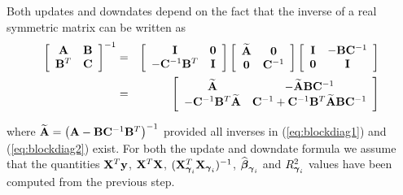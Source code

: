 Both updates and downdates depend on the fact that
the inverse of a real symmetric matrix can be written as
\begin{eqnarray}
	\displaystyle \left[ \begin{array}{cc}
		{\bf A}   & {\bf B} \\
		{\bf B}^T & {\bf C}
	\end{array} \right]^{-1}
	&  = &
	\displaystyle \left[ \begin{array}{cc}
		{\bf I} & {\bf 0} \\
		-{\bf C}^{-1}{\bf B}^T &  {\bf I}
	\end{array} \right]
	\left[ \begin{array}{cc}
		\widetilde{{\bf A}} & {\bf 0} \\
		{\bf 0} & {\bf C}^{-1}
	\end{array} \right]
	\left[ \begin{array}{cc}
		{\bf I}    & -{\bf B}{\bf C}^{-1}\\
		{\bf 0} & {\bf I}
	\end{array} \right] \label{eq:blockdiag1}\\
	&  = &
	\displaystyle\left[
	\begin{array}{cc}
		\widetilde{{\bf A}}
		& - \widetilde{{\bf A}}{\bf B}{\bf C}^{-1} \\
		-{\bf C}^{-1}{\bf B}^T\widetilde{{\bf A}}
		& {\bf C}^{-1} + {\bf C}^{-1}{\bf B}^T\widetilde{{\bf A}}{\bf B}{\bf C}^{-1}
	\end{array}\right]\label{eq:blockdiag2}
\end{eqnarray}

\noindent where $\widetilde{{\bf A}} = \left({\bf A}-{\bf B}{\bf C}^{-1}{\bf B}^T\right)^{-1}$
provided all inverses in (\ref{eq:blockdiag1}) and
(\ref{eq:blockdiag2}) exist. 
For both the update and downdate formula we assume that the quantities
${\bf X}^T{\bf y}$, ${\bf X}^T{\bf X}$, $({\bf X}_{{\boldsymbol \gamma}_i}^T{\bf X}_{{\boldsymbol \gamma}_i})^{-1}$, 
$\widehat{{\boldsymbol \beta}}_{{\boldsymbol \gamma}_i}$ and $R_{{\boldsymbol \gamma}_i}^2$ values have been computed from the previous step.

